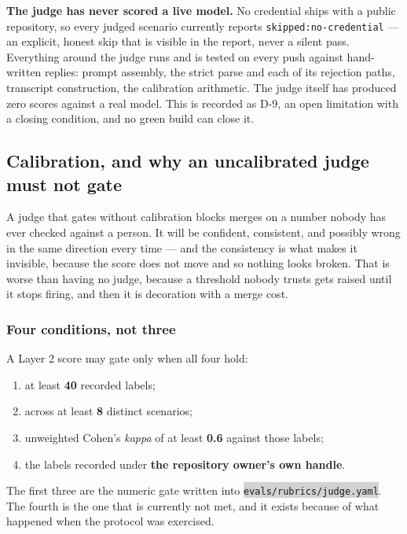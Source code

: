\documentclass[11pt,a4paper]{article}
\newcommand{\repopath}[1]{\colorbox{lightgray}{\texttt{#1}}}
\begin{document}
\textbf{The judge has never scored a live model.} No credential ships with a public repository, so every judged scenario currently reports \texttt{skipped:no-credential} --- an explicit, honest skip that is visible in the report, never a silent pass. Everything around the judge runs and is tested on every push against hand-written replies: prompt assembly, the strict parse and each of its rejection paths, transcript construction, the calibration arithmetic. The judge itself has produced zero scores against a real model. This is recorded as D-9, an open limitation with a closing condition, and no green build can close it.

\subsection{Calibration, and why an uncalibrated judge must not gate}

A judge that gates without calibration blocks merges on a number nobody has ever checked against a person. It will be confident, consistent, and possibly wrong in the same direction every time --- and the consistency is what makes it invisible, because the score does not move and so nothing looks broken. That is worse than having no judge, because a threshold nobody trusts gets raised until it stops firing, and then it is decoration with a merge cost.

\subsubsection*{Four conditions, not three}

A Layer 2 score may gate only when all four hold:

\begin{enumerate}[leftmargin=1.6em,itemsep=0.2em]
\item at least \textbf{40} recorded labels;
\item across at least \textbf{8} distinct scenarios;
\item unweighted Cohen's \emph{kappa} of at least \textbf{0.6} against those labels;
\item the labels recorded under \textbf{the repository owner's own handle}.
\end{enumerate}

The first three are the numeric gate written into \repopath{evals/rubrics/judge.yaml}. The fourth is the one that is currently not met, and it exists because of what happened when the protocol was exercised.
\end{document}
